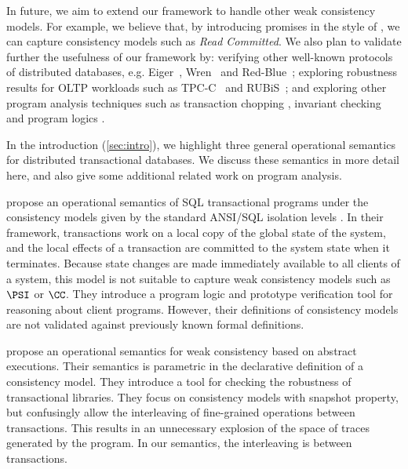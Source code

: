 In future, we aim to extend our framework to handle other 
weak consistency models. For example, we believe that, by introducing promises 
in the style of \cite{promises}, we can capture  consistency models such 
as \emph{Read Committed}. We also plan to validate further the usefulness of our framework
by: verifying other well-known protocols of 
distributed databases, e.g. Eiger~\cite{eiger}, Wren~\cite{wren} and
Red-Blue~\cite{redblue};  exploring robustness results for OLTP
workloads  such as TPC-C~\cite{tpcc} and RUBiS~\cite{rubis}; 
and exploring other program analysis techniques such as 
transaction chopping \cite{chopping,psi-chopping}, invariant checking 
\cite{cise,repliss} and program logics \cite{alonetogether}. 

In the introduction (\cref{sec:intro}), we highlight three general operational semantics for 
distributed transactional databases. We discuss these semantics in more detail here,
and also give some additional related work on program analysis. 

\citet{alonetogether} propose an operational semantics of SQL transactional programs 
under the consistency models given by the standard ANSI/SQL isolation levels \cite{si}.
In their  framework, transactions work on a local copy of the global state 
of the system, and the local effects of a transaction are committed to the  
system state when it terminates. Because state changes 
are made immediately available to all clients of a system, this model 
is not suitable to capture weak consistency models such as \(\PSI\) or \(\CC\). 
They introduce a program logic and prototype verification tool for reasoning 
about client programs. However, their definitions of consistency models 
are not validated against previously known 
formal definitions.

\citet{sureshConcur} propose an operational semantics for weak consistency 
based on abstract executions. Their semantics 
is parametric in the declarative definition of a consistency model. 
They introduce a tool for checking the robustness of transactional  
libraries.
They focus on consistency models with snapshot property, but confusingly allow 
the interleaving of fine-grained operations between transactions. 
This results in an unnecessary explosion of the space of traces generated by 
the program. In our semantics, the interleaving is between transactions.

